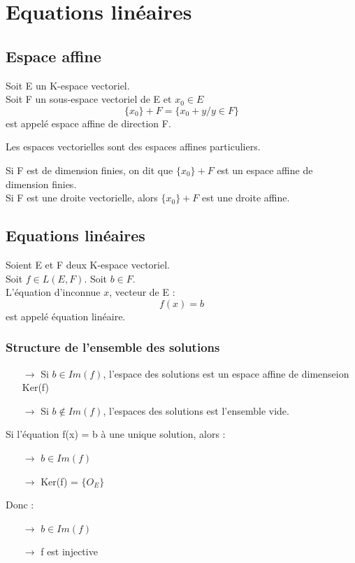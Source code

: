 \chapter{Equations linéaires}
\section{Espace affine}
\begin{de}
Soit E un K-espace vectoriel.\\
Soit F un sous-espace vectoriel de E et $x_0 \in E$
$$\{ x_0 \} + F = \{x_0 +y / y \in F \}$$
est appelé espace affine de direction F.
\end{de}
\begin{prop}
Les espaces vectorielles sont des espaces affines particuliers.
\end{prop}
\begin{prop}
Si F est de dimension finies, on dit que $\{x_0\} + F$ est un espace affine de dimension finies.\\
Si F est une droite vectorielle, alors $\{x_0\} + F$ est une droite affine.
\end{prop}
\section{Equations linéaires}
\begin{de}
Soient E et F deux K-espace vectoriel.\\
Soit $f \in L(E,F)$. Soit $b \in F$.\\
L'équation d'inconnue $x$, vecteur de E :
$$f(x) = b$$
est appelé équation linéaire.
\end{de}
\subsection{Structure de l'ensemble des solutions}
\begin{itemize}
 \item[$\rightarrow$] Si $b \in Im(f)$, l'espace des solutions est un espace affine de dimenseion Ker(f)
 \item[$\rightarrow$] Si $b \notin Im(f)$, l'espaces des solutions est l'ensemble vide.
\end{itemize}
\begin{prop}
Si l'équation f(x) = b à une unique solution, alors :
\begin{itemize}
 \item[$\rightarrow$]$b \in Im(f)$
 \item[$\rightarrow$]Ker(f) = $\{ O_E \}$
\end{itemize}
Donc : 
\begin{itemize}
 \item[$\rightarrow$]$b \in Im(f)$
 \item[$\rightarrow$]f est injective
\end{itemize}
\end{prop}
